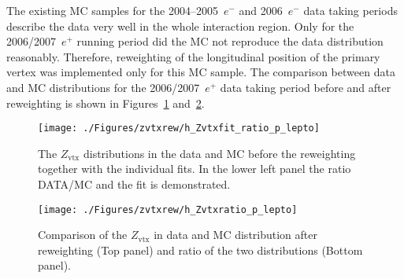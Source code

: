 The existing MC samples for the 2004--2005~$e^-$ and 2006~$e^-$ data taking periods describe the data very well in the whole interaction region. Only for the 2006/2007~$e^+$ running period did the MC not reproduce the data distribution reasonably. Therefore, reweighting of the longitudinal position of the primary vertex was implemented only for this MC sample. The comparison between data and MC distributions for the 2006/2007~$e^+$ data taking period before and after reweighting is shown in Figures~\ref{fig:zvtxrew} and~\ref{fig:zvtxrewaf}.
\begin{figure}[t]
\begin{center}
 \hspace{-35pt}\texttt{[image: ./Figures/zvtxrew/h\_Zvtxfit\_ratio\_p\_lepto]}%
\end{center}
\caption{The $Z_\text{vtx}$ distributions in the data and \lepto MC before the reweighting together with the individual fits. In the lower left panel the ratio DATA/MC and the fit is demonstrated.} 
\label{fig:zvtxrew}
\end{figure}

\begin{figure}[p]
\begin{center}
 \texttt{[image: ./Figures/zvtxrew/h\_Zvtxratio\_p\_lepto]}
\end{center}
\caption{Comparison of the $Z_\text{vtx}$ in data and \lepto MC distribution after reweighting (Top panel) and ratio of the two distributions (Bottom panel).} 
\label{fig:zvtxrewaf}
\end{figure}